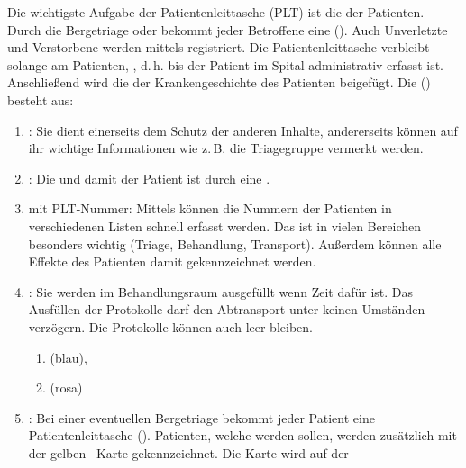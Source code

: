{%
Die wichtigste Aufgabe der Patientenleittasche (PLT) ist die  der Patienten.
%
Durch die Bergetriage oder 
 bekommt jeder
Betroffene eine   (). 
%
Auch Unverletzte und
Verstorbene werden mittels  registriert.
%
Die Patientenleittasche verbleibt solange am Patienten,
, 
d.\,h. bis der Patient im Spital administrativ erfasst
ist.
% 
Anschließend wird die  der Krankengeschichte
des Patienten beigefügt.
%
Die  ()
besteht aus:

\begin{enumerate}
  \item {}: 
  Sie dient einerseits dem Schutz der anderen Inhalte, 
  andererseits können auf ihr wichtige Informationen wie z.\,B. die 
  Triagegruppe vermerkt werden.
  \item {}:
  Die  und damit der Patient ist durch eine
   .
  \item {} mit PLT-Nummer: 
  Mittels  können die Nummern der
  Patienten in verschiedenen Listen schnell erfasst werden.
  Das ist in vielen Bereichen besonders wichtig 
  (Triage,
  Behandlung, 
  Transport). 
  Außerdem können alle Effekte des
  Patienten damit gekennzeichnet werden.
  \item {}: 
  Sie werden im Behandlungsraum ausgefüllt wenn
  Zeit dafür ist. 
  Das Ausfüllen der Protokolle darf den
  Abtransport unter keinen Umständen verzögern. 
  Die Protokolle
  können auch leer bleiben.
  \begin{enumerate}
    \item {} (blau),
    \item {} (rosa) 
  \end{enumerate}
  \item {}: 
  Bei einer eventuellen Bergetriage bekommt jeder Patient eine
  Patientenleittasche (). 
  Patienten, welche
   werden sollen, 
  werden zusätzlich mit der gelben 
  {}\,-Karte 
  gekennzeichnet. 
  Die Karte wird auf der

\end{enumerate}}
